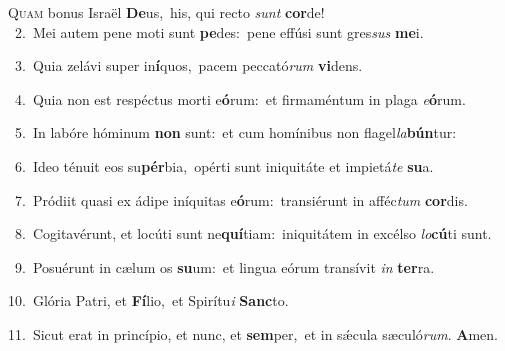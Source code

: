 \lettrine{\initial\textcolor{\initialcolor}{Q}}{uam} bonus Israël \textbf{De}\-us,~\star his, qui recto \textit{sunt} \textbf{cor}\-de!\\
{\numbfont\textcolor{\numbcolor}{~2.}}~Mei autem pene moti sunt \textbf{pe}\-des:~\star pene effúsi sunt gres\textit{sus} \textbf{me}\-i.\par
{\numbfont\textcolor{\numbcolor}{~3.}}~Quia zelávi super in\-\textbf{í}\-quos,~\star pacem peccató\textit{rum} \textbf{vi}\-dens.\par
{\numbfont\textcolor{\numbcolor}{~4.}}~Quia non est respéctus morti e\-\textbf{ó}\-rum:~\star et firmaméntum in plaga \textit{e}\-\textbf{ó}rum.\par
{\numbfont\textcolor{\numbcolor}{~5.}}~In labóre hóminum \textbf{non} sunt:~\star et cum homínibus non flagel\-\textit{la}\-\textbf{bún}tur:\par
{\numbfont\textcolor{\numbcolor}{~6.}}~Ideo ténuit eos su\-\textbf{pér}\-bia,~\star opérti sunt iniquitáte et impietá\textit{te} \textbf{su}\-a.\par
{\numbfont\textcolor{\numbcolor}{~7.}}~Pródiit quasi ex ádipe iníquitas e\-\textbf{ó}\-rum:~\star transiérunt in afféc\textit{tum} \textbf{cor}\-dis.\par
{\numbfont\textcolor{\numbcolor}{~8.}}~Cogitavérunt, et locúti sunt ne\-\textbf{quí}\-tiam:~\star iniquitátem in excélso \textit{lo}\-\textbf{cú}ti sunt.\par
{\numbfont\textcolor{\numbcolor}{~9.}}~Posuérunt in cælum os \textbf{su}\-um:~\star et lingua eórum transívit \textit{in} \textbf{ter}\-ra.\par
{\numbfont\textcolor{\numbcolor}{10.}}~Glória Patri, et \textbf{Fí}\-lio,~\star et Spirítu\textit{i} \textbf{Sanc}\-to.\par
{\numbfont\textcolor{\numbcolor}{11.}}~Sicut erat in princípio, et nunc, et \textbf{sem}\-per,~\star et in sǽcula sæculó\-\textit{rum}\-. \textbf{A}\-men.\par
